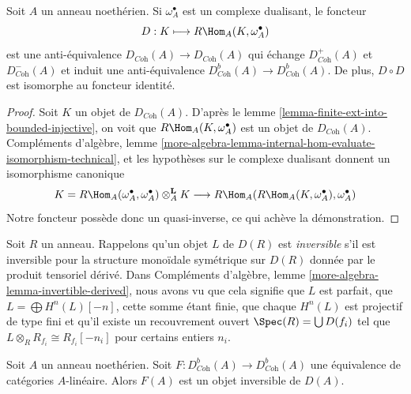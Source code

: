 \begin{lemma}
\label{lemma-dualizing}
Soit $A$ un anneau noethérien. Si $\omega_A^\bullet$ est un complexe dualisant,
le foncteur
$$
D : K \longmapsto R\Hom_A(K, \omega_A^\bullet)
$$
est une anti-équivalence $D_{\textit{Coh}}(A) \to D_{\textit{Coh}}(A)$
qui échange $D^+_{\textit{Coh}}(A)$ et $D^-_{\textit{Coh}}(A)$
et induit une anti-équivalence
$D^b_{\textit{Coh}}(A) \to D^b_{\textit{Coh}}(A)$.
De plus, $D \circ D$ est isomorphe au foncteur identité.
\end{lemma}

\begin{proof}
Soit $K$ un objet de $D_{\textit{Coh}}(A)$. D'après le lemme \ref{lemma-finite-ext-into-bounded-injective},
on voit que $R\Hom_A(K, \omega_A^\bullet)$ est un objet de $D_{\textit{Coh}}(A)$.
Compléments d'algèbre, lemme \ref{more-algebra-lemma-internal-hom-evaluate-isomorphism-technical},
et les hypothèses sur le complexe dualisant
donnent un isomorphisme canonique
$$
K = R\Hom_A(\omega_A^\bullet, \omega_A^\bullet) \otimes_A^\mathbf{L} K
\longrightarrow
R\Hom_A(R\Hom_A(K, \omega_A^\bullet), \omega_A^\bullet)
$$
Notre foncteur possède donc un quasi-inverse, ce qui achève la démonstration.
\end{proof}

\noindent
Soit $R$ un anneau. Rappelons qu'un objet $L$ de $D(R)$
est {\it inversible} s'il est inversible pour la structure
monoïdale symétrique sur $D(R)$ donnée par le produit tensoriel dérivé.
Dans Compléments d'algèbre, lemme \ref{more-algebra-lemma-invertible-derived}, nous avons vu que cela signifie
que $L$ est parfait, que $L = \bigoplus H^n(L)[-n]$, cette somme étant finie,
que chaque $H^n(L)$ est projectif de type fini
et qu'il existe un recouvrement ouvert $\Spec(R) = \bigcup D(f_i)$ tel que
$L \otimes_R R_{f_i} \cong R_{f_i}[-n_i]$ pour certains entiers $n_i$.

\begin{lemma}
\label{lemma-equivalence-comes-from-invertible}
Soit $A$ un anneau noethérien. Soit $F : D^b_{\textit{Coh}}(A) \to D^b_{\textit{Coh}}(A)$
une équivalence de catégories $A$-linéaire.
Alors $F(A)$ est un objet inversible de $D(A)$.
\end{lemma}

